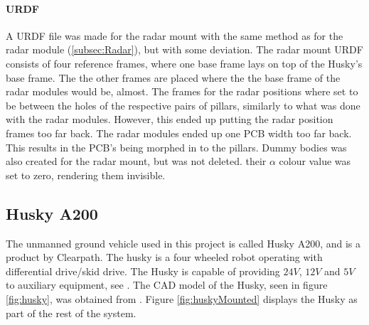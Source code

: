 
\paragraph{URDF}
A URDF file was made for the radar mount with the same method as for the radar module (\ref{subsec:Radar}), but with some deviation. The radar mount URDF consists of four reference frames, where one base frame lays on top of the Husky's base frame. The the other frames are placed where the the base frame of the radar modules would be, almost. The frames for the radar positions where set to be between the holes of the respective pairs of pillars, similarly to what was done with the radar modules. However, this ended up putting the radar position frames too far back. The radar modules ended up one PCB width too far back. This results in the PCB's being morphed in to the pillars. Dummy bodies was also created for the radar mount, but was not deleted. their $\alpha$ colour value was set to zero, rendering them invisible. 

\subsection{Husky A200}\label{subsec:Husky}
The unmanned ground vehicle used in this project is called Husky A200, and is a product by Clearpath. The husky is a four wheeled robot operating with differential drive/skid drive. The Husky is capable of providing $24 V$, $12 V$ and $5 V$ to auxiliary equipment, see \cite{husky-ugv}. The CAD model of the Husky, seen in figure \ref{fig:husky}, was obtained from \cite{husky3DModelWebsite}. Figure \ref{fig:huskyMounted} displays the Husky as part of the rest of the system.

